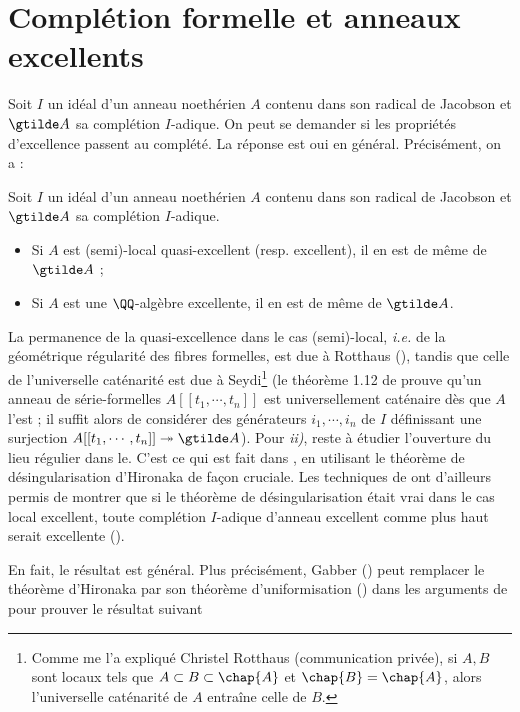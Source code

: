 \documentclass[10pt]{../fichiers-configuration-latex/smfart}
\begin{document}
\section{Complétion formelle et anneaux excellents}

Soit $I$ un idéal d'un anneau noethérien $A$ contenu dans son radical de Jacobson et $\gtilde A$ sa
complétion $I$-adique. On peut se demander si les propriétés d'excellence passent au complété. La
réponse est oui en général. Précisément, on a :

\begin{proposition} Soit $I$ un idéal d'un anneau noethérien $A$ contenu dans son radical de
Jacobson et $\gtilde A$ sa complétion $I$-adique.  \begin{itemize} \item [i)] Si $A$ est
(semi)-local quasi-excellent (resp. excellent), il en est de même de $\gtilde A$ ; \item [ii)] Si
$A$ est une $\QQ$-algèbre excellente, il en est de même de $\gtilde A$.  \end{itemize}
\end{proposition}


La permanence de la quasi-excellence dans le cas (semi)-local, \emph{i.e.} de la géométrique régularité des
fibres formelles, est due à Rotthaus (\cite{Rot80}), tandis que celle de l'universelle caténarité
est due à Seydi\footnote{Comme me l'a expliqué Christel Rotthaus (communication privée), si $A, B$
sont locaux tels que $A\subset B \subset \chap{A}$ et $\chap{B}=\chap{A}$, alors l'universelle
caténarité de $A$ entraîne celle de $B$.} (le théorème 1.12 de \cite{Sey70} prouve qu'un anneau de
série-formelles $A[[t_1,\cdots,t_n]]$ est universellement caténaire dès que $A$ l'est ; il suffit
alors de considérer des générateurs $i_1,\cdots,i_n$ de $I$ définissant une surjection
$A[[t_1,\cdots,t_n]]\twoheadrightarrow \gtilde A$). Pour \textit{ii)}, reste à étudier l'ouverture
du lieu régulier dans le.  C'est ce qui est fait dans \cite{Bro-Rot80}, en utilisant le théorème de
désingularisation d'Hironaka de façon cruciale. Les techniques de \cite{Bro-Rot80} ont d'ailleurs
permis de montrer que si le théorème de désingularisation était vrai dans le cas local excellent,
toute complétion $I$-adique d'anneau excellent comme plus haut serait excellente (\cite{Nis-Nis87}).

En fait, le résultat est général. Plus précisément, Gabber (\cite{Gab07}) peut remplacer le théorème
d'Hironaka par son théorème d'uniformisation () dans les arguments de
\cite{Nis-Nis87} pour prouver le résultat suivant
\end{document}
